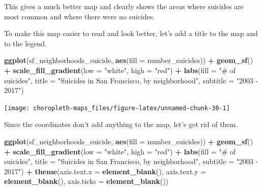 \documentclass[
  12pt,
]{book}
\newenvironment{Shaded}{\begin{snugshade}}{\end{snugshade}}
\newcommand{\DataTypeTok}[1]{\textcolor[rgb]{0.13,0.29,0.53}{#1}}
\newcommand{\KeywordTok}[1]{\textcolor[rgb]{0.13,0.29,0.53}{\textbf{#1}}}
\newcommand{\NormalTok}[1]{#1}
\newcommand{\OperatorTok}[1]{\textcolor[rgb]{0.81,0.36,0.00}{\textbf{#1}}}
\newcommand{\StringTok}[1]{\textcolor[rgb]{0.31,0.60,0.02}{#1}}
\begin{document}
This gives a much better map and clearly shows the areas where suicides are most common and where there were no suicides.

To make this map easier to read and look better, let's add a title to the map and to the legend.

\begin{Shaded}
\begin{Highlighting}[]
\KeywordTok{ggplot}\NormalTok{(sf\_neighborhoods\_suicide, }\KeywordTok{aes}\NormalTok{(}\DataTypeTok{fill =}\NormalTok{ number\_suicides)) }\OperatorTok{+}
\StringTok{  }\KeywordTok{geom\_sf}\NormalTok{() }\OperatorTok{+}
\StringTok{  }\KeywordTok{scale\_fill\_gradient}\NormalTok{(}\DataTypeTok{low =} \StringTok{"white"}\NormalTok{, }\DataTypeTok{high =} \StringTok{"red"}\NormalTok{) }\OperatorTok{+}
\StringTok{  }\KeywordTok{labs}\NormalTok{(}\DataTypeTok{fill =} \StringTok{"\# of suicides"}\NormalTok{,}
       \DataTypeTok{title =} \StringTok{"Suicides in San Francisco, by neighborhood"}\NormalTok{,}
       \DataTypeTok{subtitle =} \StringTok{"2003 {-} 2017"}\NormalTok{) }
\end{Highlighting}
\end{Shaded}

\begin{center}\texttt{[image: choropleth-maps\_files/figure-latex/unnamed-chunk-30-1]} \end{center}

Since the coordinates don't add anything to the map, let's get rid of them.

\begin{Shaded}
\begin{Highlighting}[]
\KeywordTok{ggplot}\NormalTok{(sf\_neighborhoods\_suicide, }\KeywordTok{aes}\NormalTok{(}\DataTypeTok{fill =}\NormalTok{ number\_suicides)) }\OperatorTok{+}
\StringTok{  }\KeywordTok{geom\_sf}\NormalTok{() }\OperatorTok{+}
\StringTok{  }\KeywordTok{scale\_fill\_gradient}\NormalTok{(}\DataTypeTok{low =} \StringTok{"white"}\NormalTok{, }\DataTypeTok{high =} \StringTok{"red"}\NormalTok{) }\OperatorTok{+}
\StringTok{  }\KeywordTok{labs}\NormalTok{(}\DataTypeTok{fill =} \StringTok{"\# of suicides"}\NormalTok{,}
       \DataTypeTok{title =} \StringTok{"Suicides in San Francisco, by neighborhood"}\NormalTok{,}
       \DataTypeTok{subtitle =} \StringTok{"2003 {-} 2017"}\NormalTok{) }\OperatorTok{+}
\StringTok{  }\KeywordTok{theme}\NormalTok{(}\DataTypeTok{axis.text.x =} \KeywordTok{element\_blank}\NormalTok{(),}
        \DataTypeTok{axis.text.y =} \KeywordTok{element\_blank}\NormalTok{(),}
        \DataTypeTok{axis.ticks =} \KeywordTok{element\_blank}\NormalTok{())}
\end{Highlighting}
\end{Shaded}
\end{document}
